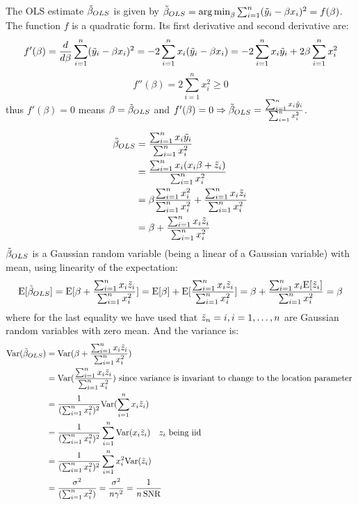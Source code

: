 \documentclass[12pt,twoside]{article}
\begin{document}
\begin{enumerate}
\begin{enumerate}
  \medskip 
 The OLS estimate $\tilde{ \beta }_{OLS}$ is given by $\tilde{ \beta }_{OLS} = \operatorname*{arg\,min}_\beta \sum_{i=1}^n (\tilde{  y }_i - \beta x_i)^2 = f(\beta)$.
 The function $f$ is a quadratic form. Its first derivative and second derivative are:
 $$f'(\beta) = \frac{d}{d\beta}  \sum_{i=1}^n (\tilde{  y }_i - \beta x_i)^2 = -2 \sum_{i=1}^n x_i (\tilde{  y }_i - \beta x_i) = -2  \sum_{i=1}^n  x_i \tilde{  y }_i + 2 \beta  \sum_{i=1}^n x_i^2$$
 $$f''(\beta) = 2  \sum_{i=1}^n x_i^2 \ge 0$$
 thus $f'(\beta) = 0$ means $\beta = \tilde{ \beta }_{OLS}$ and  $f'(\beta) =0 \Rightarrow \tilde{ \beta }_{OLS} = \frac{ \sum_{i=1}^n x_i \tilde{  y }_i } {  \sum_{i=1}^n  x_i^2}$.
 
 \begin{align*}
	 \tilde{ \beta }_{OLS}	&=	\frac{ \sum_{i=1}^n x_i \tilde{  y }_i } {  \sum_{i=1}^n  x_i^2} \\
	 				&= 	\frac{ \sum_{i=1}^n x_i  (x_i \beta + \tilde{ z }_i) } {  \sum_{i=1}^n  x_i^2} \\
					&=	\beta \frac{ \sum_{i=1}^n x_i^2} { \sum_{i=1}^n x_i^2}  + \frac{ \sum_{i=1}^n x_i  \tilde{ z }_i} { \sum_{i=1}^n x_i^2} \\
					&=	\beta +  \frac{ \sum_{i=1}^n x_i  \tilde{ z }_i} { \sum_{i=1}^n x_i^2} 
\end{align*}  
 $\tilde{ \beta }_{OLS}$ is a Gaussian random variable (being a linear of a Gaussian variable) with mean, using linearity of the expectation:
 $$\mathrm{E}[\tilde{ \beta }_{OLS}] = \mathrm{E}[\beta +  \frac{ \sum_{i=1}^n x_i  \tilde{ z }_i} { \sum_{i=1}^n x_i^2}] = \mathrm{E}[\beta] + \mathrm{E}[ \frac{ \sum_{i=1}^n x_i  \tilde{ z }_i} { \sum_{i=1}^n x_i^2}] = \beta + \frac{ \sum_{i=1}^n x_i  \mathrm{E}[\tilde{ z }_i]} { \sum_{i=1}^n x_i^2} = \beta$$
  where for the last equality we have used that $\tilde{  z }_n=i, i=1, \dots, n$ are Gaussian random variables with zero mean.
 And the variance is:
 \begin{align*}  
 	\mathrm{Var}{(\tilde{ \beta }_{OLS})}	&=	\mathrm{Var}{	(\beta +  \frac{ \sum_{i=1}^n x_i  \tilde{ z }_i} { \sum_{i=1}^n x_i^2} ) } \\
						&= 	\mathrm{Var}{ (\frac{ \sum_{i=1}^n x_i  \tilde{ z }_i} { \sum_{i=1}^n x_i^2} ) } \text{~since variance is invariant to change to the location parameter } \\
						&=	\frac{1} { (\sum_{i=1}^n x_i^2)^2} \mathrm{Var}{( \sum_{i=1}^n x_i  \tilde{ z }_i )} \\
						&=	\frac{1} { (\sum_{i=1}^n x_i^2)^2} \sum_{i=1}^n \mathrm{Var}{(x_i   \tilde{ z }_i)} \text{ ~ $z_i$ being iid} \\
						&=	\frac{1} { (\sum_{i=1}^n x_i^2)^2} \sum_{i=1}^n x_i^2 \mathrm{Var}{( \tilde{ z }_i )} \\
						&= 	\frac{ \sigma^2} { (\sum_{i=1}^n x_i^2)} = \frac{ \sigma^2} {n \gamma^2 } = \frac{1} {n \operatorname{SNR}}
 \end{align*}  
  

\end{enumerate}
\end{enumerate}
\end{document}
